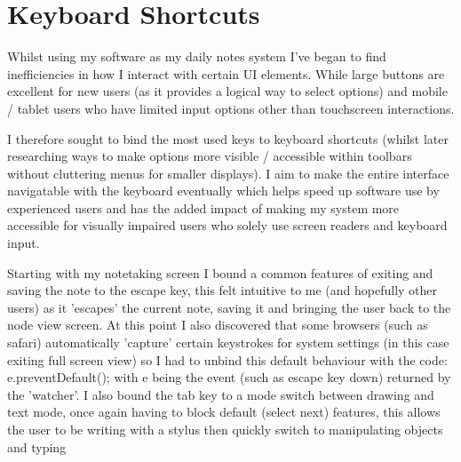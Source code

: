 \section{Keyboard Shortcuts}
\label{prototype:KeyboardShortcuts}
Whilst using my software as my daily notes system I've began to find inefficiencies in how I interact with certain UI elements. While large buttons are excellent for new users (as it provides a logical way to select options) and mobile / tablet users who have limited input options other than touchscreen interactions.

I therefore sought to bind the most used keys to keyboard shortcuts (whilst later researching ways to make options more visible / accessible within toolbars without cluttering menus for smaller displays). I aim to make the entire interface navigatable with the keyboard eventually which helps speed up software use by experienced users and has the added impact of making my system more accessible for visually impaired users who solely use screen readers and keyboard input.

Starting with my notetaking screen I bound a common features of exiting and saving the note to the escape key, this felt intuitive to me (and hopefully other users) as it 'escapes' the current note, saving it and bringing the user back to the node view screen. At this point I also discovered that some browsers (such as safari) automatically 'capture' certain keystrokes for system settings (in this case exiting full screen view) so I had to unbind this default behaviour with the code:  e.preventDefault(); with e being the event (such as escape key down) returned by the 'watcher'. I also bound the tab key to a mode switch between drawing and text mode, once again having to block default (select next) features, this allows the user to be writing with a stylus then quickly switch to manipulating objects and typing

